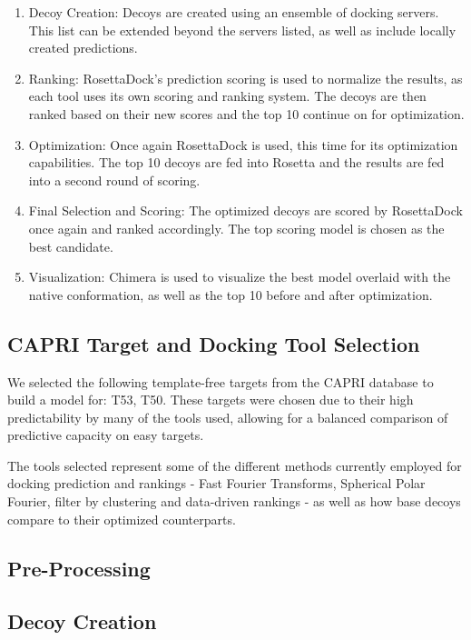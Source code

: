 \documentclass{article}
\begin{document}
\begin{enumerate}
\item Decoy Creation:
Decoys are created using an ensemble of docking servers. This list can be extended beyond the servers listed, as well as include locally created predictions.

\item Ranking:
RosettaDock's prediction scoring is used to normalize the results, as each tool uses its own scoring and ranking system. The decoys are then ranked based on their new scores and the top 10 continue on for optimization.

\item Optimization:
Once again RosettaDock is used, this time for its optimization capabilities. The top 10 decoys are fed into Rosetta and the results are fed into a second round of scoring.

\item Final Selection and Scoring:
The optimized decoys are scored by RosettaDock once again and ranked accordingly. The top scoring model is chosen as the best candidate.

\item Visualization:
Chimera is used to visualize the best model overlaid with the native conformation, as well as the top 10 before and after optimization.
\end{enumerate}

\subsection{CAPRI Target and Docking Tool Selection}

We selected the following template-free targets from the CAPRI database to build a model for: T53, T50. These targets were chosen due to their high predictability by many of the tools used, allowing for a balanced comparison of predictive capacity on easy targets.

The tools selected represent some of the different methods currently employed for docking prediction and rankings - Fast Fourier Transforms, Spherical Polar Fourier, filter by clustering and data-driven rankings - as well as how base decoys compare to their optimized counterparts. 

\subsection{Pre-Processing}

\subsection{Decoy Creation}
\end{document}
